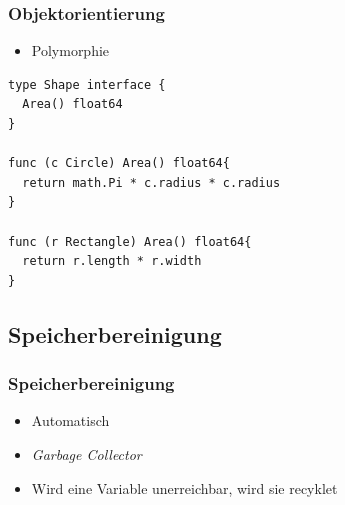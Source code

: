\documentclass{beamer}
\begin{document}
\begin{frame}[fragile]
\frametitle{Objektorientierung}

\begin{itemize}
\item Polymorphie
\end{itemize}

\begin{lstlisting}
type Shape interface {
  Area() float64
}

func (c Circle) Area() float64{
  return math.Pi * c.radius * c.radius
}

func (r Rectangle) Area() float64{
  return r.length * r.width
}
\end{lstlisting}

\end{frame}

\subsection{Speicherbereinigung}
\begin{frame}
\frametitle{Speicherbereinigung}

\begin{itemize}
\setlength{\itemsep}{30pt}
\item Automatisch
\item \textit{Garbage Collector}
\item Wird eine Variable unerreichbar, wird sie recyklet
\end{itemize}

\end{frame}
\end{document}
